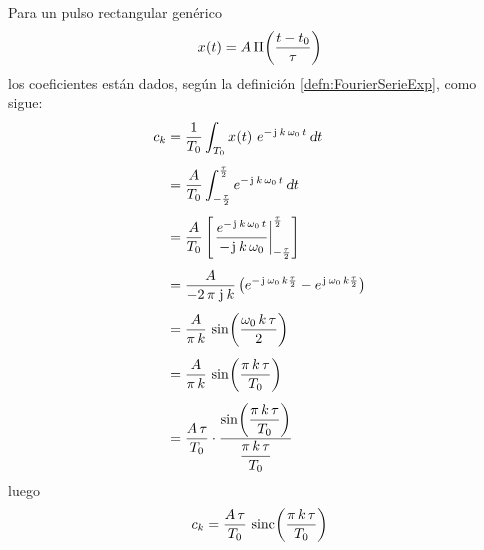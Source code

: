 Para un pulso rectangular genérico
\[
    \fx[x]{t} = A \, \fx[\Pi]{\frac{t-t_0}{\tau}}
\]
los coeficientes están dados, según la definición \ref{defn:FourierSerieExp}, como sigue:
\begin{align*}
    c_\kth &= \frac{1}{T_0} \int_{T_0} \fx[x]{t} \, e^{-\iu \, \kth \, \omega_0 \, t} \, \dif t
    \\[1ex]
    &= \frac{A}{T_0} \int_{-\frac{\tau}{2}}^{\frac{\tau}{2}} e^{-\iu \, \kth \, \omega_0 \, t} \, \dif t
    \\[1ex]
    &= \frac{A}{T_0} \barrow{\dfrac{e^{-\iu \, \kth \, \omega_0 \, t}}{-\iu \, \kth \, \omega_0}}{-\frac{\tau}{2}}{\frac{\tau}{2}}
    \\[1ex]
    &= \frac{A}{-2 \, \pi \, \iu \, \kth } \inParentheses{ e^{ -\iu \, \omega_0 \, \kth \frac{\tau}{2}} - e^{ \iu \, \omega_0 \, \kth \frac{\tau}{2}} }
    \\[1ex]
    &= \frac{A}{\pi \, \kth} \, \fx[\sin]{\frac{\omega_0 \, \kth \, \tau}{2}}
    \\[1ex]
    &= \frac{A}{\pi \, \kth} \, \fx[\sin]{\frac{\pi \, \kth \, \tau}{T_0}}
    \\[1ex]
    &= \frac{A \, \tau}{T_0} \cdot
    \frac{ \fx[\sin]{\dfrac{\pi \, \kth \, \tau}{T_0}} }{ \dfrac{\pi \, \kth \, \tau}{T_0} }
\end{align*}
luego
\begin{equation}
    c_\kth = \frac{A \, \tau}{T_0} \, \fx[\sinc]{\frac{\pi \, \kth \, \tau}{T_0}}
    \label{eqn:ckPulso}
\end{equation}

